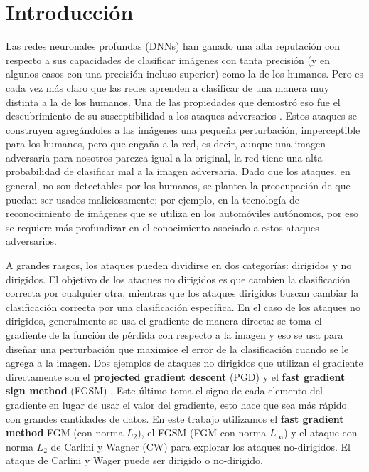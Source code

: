 \section{Introducción}

Las redes neuronales profundas (DNNs) han ganado una alta reputación con respecto a sus capacidades de clasificar imágenes con tanta precisión (y en algunos casos con una precisión incluso superior) como la de los humanos. Pero es cada vez más claro que las redes aprenden a clasificar de una manera muy distinta a la de los humanos. Una de las propiedades que demostró eso fue el descubrimiento de su susceptibilidad a los ataques adversarios \cite{szegedy2014intriguing}. Estos ataques se construyen agregándoles a las imágenes una pequeña perturbación, imperceptible para los humanos, pero que engaña a la red, es decir, aunque una imagen adversaria para nosotros parezca igual a la original, la red tiene una alta probabilidad de clasificar mal a la imagen adversaria. Dado que los ataques, en general, no son detectables por los humanos, se plantea la preocupación de que puedan ser usados maliciosamente; por ejemplo, en la tecnología de reconocimiento de imágenes que se utiliza en los automóviles autónomos, por eso se requiere más profundizar en el conocimiento asociado a estos ataques adversarios.

A grandes rasgos, los ataques pueden dividirse en dos categorías: dirigidos y no dirigidos. El objetivo de los ataques no dirigidos es que cambien la clasificación correcta por cualquier otra, mientras que los ataques dirigidos buscan cambiar la clasificación correcta por una clasificación específica. En el caso de los ataques no dirigidos, generalmente se usa el gradiente de manera directa: se toma el gradiente de la función de pérdida con respecto a la imagen y eso se usa para diseñar una perturbación que maximice el error de la clasificación cuando se le agrega a la imagen. Dos ejemplos de ataques no dirigidos que utilizan el gradiente directamente son el \textbf{projected gradient descent} (PGD) \cite{madry2019deep} y el \textbf{fast gradient sign method} (FGSM) \cite{goodfellow2015explaining}. Este último toma el signo de cada elemento del gradiente en lugar de usar el valor del gradiente, esto hace que sea más rápido con grandes cantidades de datos. En este trabajo utilizamos el \textbf{fast gradient method} FGM (con norma $L_2$), el FGSM (FGM con norma $L_\infty$) y el ataque con norma $L_2$ de Carlini y Wagner (CW) para explorar los ataques no-dirigidos. El ataque de Carlini y Wager puede ser dirigido o no-dirigido. 

